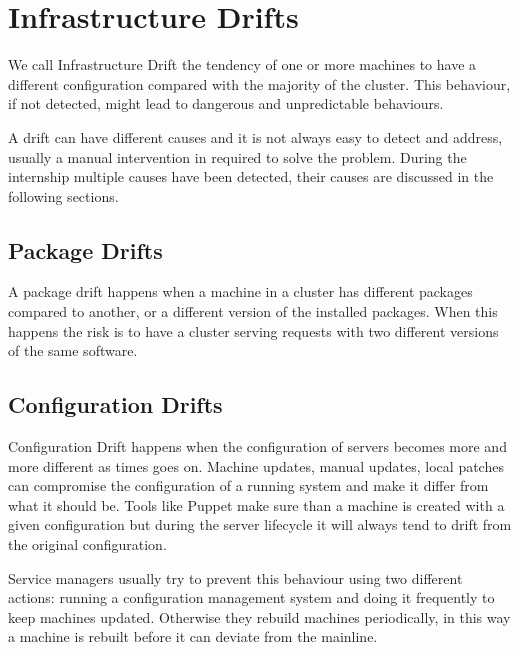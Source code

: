\section{Infrastructure Drifts}

We call Infrastructure Drift the tendency of one or more machines to have
a different configuration compared with the majority of the cluster. This
behaviour, if not detected, might lead to dangerous and unpredictable
behaviours.

A drift can have different causes and it is not always easy to detect and
address, usually a manual intervention in required to solve the problem.
During the internship multiple causes have been detected, their causes are
discussed in the following sections.

\subsection{Package Drifts}

A package drift happens when a machine in a cluster has different packages
compared to another, or a different version of the installed packages.
When this happens the risk is to have a cluster serving requests with two
different versions of the same software.

\subsection{Configuration Drifts}

Configuration Drift happens when the configuration of servers becomes more
and more different as times goes on. Machine updates, manual updates,
local patches can compromise the configuration of a running system and
make it differ from what it should be. Tools like Puppet make sure than
a machine is created with a given configuration but during the server
lifecycle it will always tend to drift from the original configuration.

Service managers usually try to prevent this behaviour using two different
actions: running a configuration management system and doing it frequently
to keep machines updated. Otherwise they rebuild machines periodically, in
this way a machine is rebuilt before it can deviate from the mainline.
